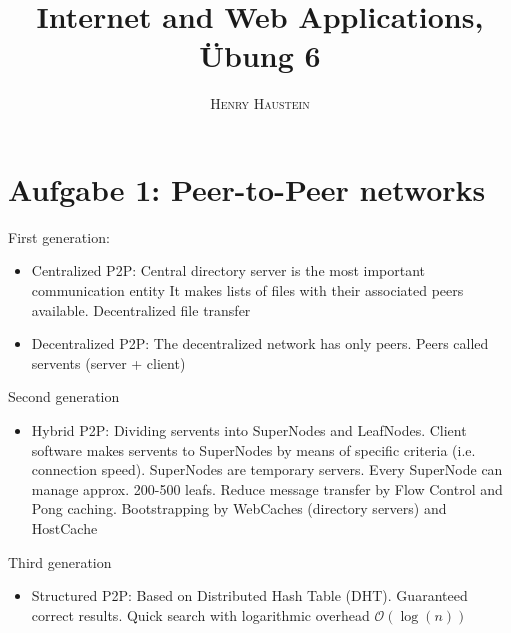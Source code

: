 \documentclass{article}
\title{\textbf{Internet and Web Applications, Übung 6}}
\author{\textsc{Henry Haustein}}
\date{}
\begin{document}
	\maketitle
	
	\section*{Aufgabe 1: Peer-to-Peer networks}
	First generation:
	\begin{itemize}
		\item Centralized P2P: Central directory server is the most important communication entity It makes lists of files with their associated peers available. Decentralized file transfer
		\item Decentralized P2P: The decentralized network has only peers. Peers called servents (server + client)
	\end{itemize}
	Second generation
	\begin{itemize}
		\item Hybrid P2P: Dividing servents into SuperNodes and LeafNodes. Client software makes servents to SuperNodes by means of specific criteria (i.e. connection speed). SuperNodes are temporary servers. Every SuperNode can manage approx. 200-500 leafs. Reduce message transfer by Flow Control and Pong caching. Bootstrapping by WebCaches (directory servers) and HostCache
	\end{itemize}
	Third generation
	\begin{itemize}
		\item Structured P2P: Based on Distributed Hash Table (DHT). Guaranteed correct results. Quick search with logarithmic overhead $\mathcal{O}(\log(n))$
	\end{itemize}
	
\end{document}
